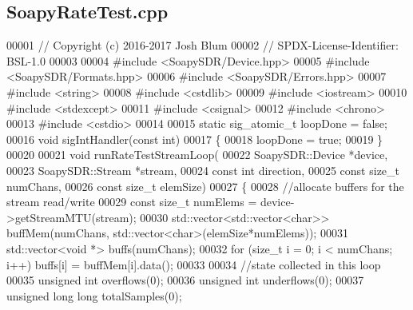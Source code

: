 \subsection{Soapy\+Rate\+Test.\+cpp}
\label{SoapyRateTest_8cpp_source}

\begin{DoxyCode}
00001 \textcolor{comment}{// Copyright (c) 2016-2017 Josh Blum}
00002 \textcolor{comment}{// SPDX-License-Identifier: BSL-1.0}
00003 
00004 \textcolor{preprocessor}{#include <SoapySDR/Device.hpp>}
00005 \textcolor{preprocessor}{#include <SoapySDR/Formats.hpp>}
00006 \textcolor{preprocessor}{#include <SoapySDR/Errors.hpp>}
00007 \textcolor{preprocessor}{#include <string>}
00008 \textcolor{preprocessor}{#include <cstdlib>}
00009 \textcolor{preprocessor}{#include <iostream>}
00010 \textcolor{preprocessor}{#include <stdexcept>}
00011 \textcolor{preprocessor}{#include <csignal>}
00012 \textcolor{preprocessor}{#include <chrono>}
00013 \textcolor{preprocessor}{#include <cstdio>}
00014 
00015 \textcolor{keyword}{static} sig\_atomic\_t loopDone = \textcolor{keyword}{false};
00016 \textcolor{keywordtype}{void} sigIntHandler(\textcolor{keyword}{const} \textcolor{keywordtype}{int})
00017 \{
00018     loopDone = \textcolor{keyword}{true};
00019 \}
00020 
00021 \textcolor{keywordtype}{void} runRateTestStreamLoop(
00022     SoapySDR::Device *device,
00023     SoapySDR::Stream *stream,
00024     \textcolor{keyword}{const} \textcolor{keywordtype}{int} direction,
00025     \textcolor{keyword}{const} \textcolor{keywordtype}{size\_t} numChans,
00026     \textcolor{keyword}{const} \textcolor{keywordtype}{size\_t} elemSize)
00027 \{
00028     \textcolor{comment}{//allocate buffers for the stream read/write}
00029     \textcolor{keyword}{const} \textcolor{keywordtype}{size\_t} numElems = device->getStreamMTU(stream);
00030     std::vector<std::vector<char>> buffMem(numChans, std::vector<char>(elemSize*numElems));
00031     std::vector<void *> buffs(numChans);
00032     \textcolor{keywordflow}{for} (\textcolor{keywordtype}{size\_t} i = 0; i < numChans; i++) buffs[i] = buffMem[i].data();
00033 
00034     \textcolor{comment}{//state collected in this loop}
00035     \textcolor{keywordtype}{unsigned} \textcolor{keywordtype}{int} overflows(0);
00036     \textcolor{keywordtype}{unsigned} \textcolor{keywordtype}{int} underflows(0);
00037     \textcolor{keywordtype}{unsigned} \textcolor{keywordtype}{long} \textcolor{keywordtype}{long} totalSamples(0);

\end{DoxyCode}
